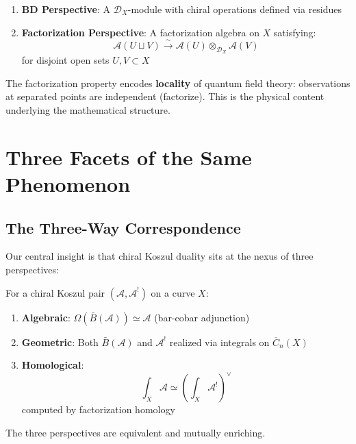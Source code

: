 \begin{enumerate}
\item \textbf{BD Perspective}: A $\mathcal{D}_X$-module with chiral operations defined via residues
\item \textbf{Factorization Perspective}: A factorization algebra on $X$ satisfying:
\begin{equation}
\mathcal{A}(U \sqcup V) \xrightarrow{\sim} \mathcal{A}(U) \otimes_{\mathcal{D}_X} \mathcal{A}(V)
\end{equation}
for disjoint open sets $U, V \subset X$
\end{enumerate}

\begin{remark}
The factorization property encodes \textbf{locality} of quantum field theory: observations at separated points are independent (factorize). This is the physical content underlying the mathematical structure.
\end{remark}

\section{Three Facets of the Same Phenomenon}
\label{sec:NAP-unifying}

\subsection{The Three-Way Correspondence}

Our central insight is that chiral Koszul duality sits at the nexus of three perspectives:

\begin{center}
\end{center}

\begin{theorem}
\label{thm:three-way-correspondence}
For a chiral Koszul pair $(\mathcal{A}, \mathcal{A}^!)$ on a curve $X$:
\begin{enumerate}
\item \textbf{Algebraic}: $\Omega(\bar{B}(\mathcal{A})) \simeq \mathcal{A}$ (bar-cobar adjunction)
\item \textbf{Geometric}: Both $\bar{B}(\mathcal{A})$ and $\mathcal{A}^!$ realized via integrals on $\overline{C}_n(X)$
\item \textbf{Homological}: 
\begin{equation}
\int_X \mathcal{A} \simeq \left(\int_X \mathcal{A}^!\right)^\vee
\end{equation}
computed by factorization homology
\end{enumerate}
The three perspectives are equivalent and mutually enriching.
\end{theorem}


